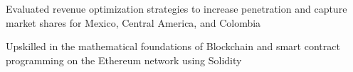 \documentclass[]{resume}
\begin{document}
\begin{minipage}[t]{0.70\textwidth}
\begin{tightemize}
\sectionsep
\item Evaluated revenue optimization strategies to increase penetration and capture market shares for Mexico, Central America, and Colombia
\end{tightemize}
\sectionsep

\begin{tightemize}
\sectionsep
\item Upskilled in the mathematical foundations of Blockchain and smart contract programming on the Ethereum network using Solidity
\end{tightemize}
\sectionsep


\end{minipage} 
\hfill
\end{document}
